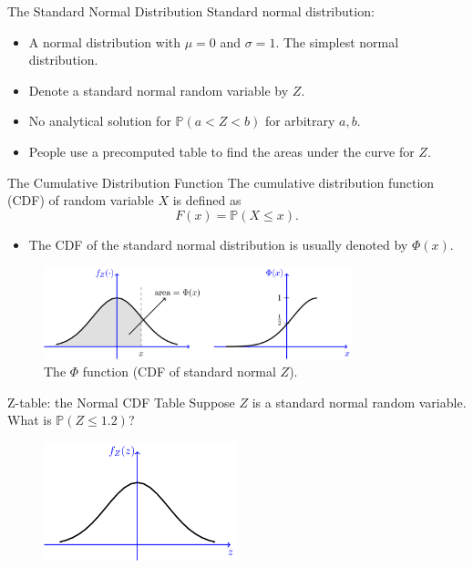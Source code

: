 \documentclass{beamer}
\newcommand{\pr}{\mathbb{P}}
\begin{document}
\begin{frame}{ The \alert{Standard} Normal Distribution}
Standard normal distribution:
\begin{itemize}
\item A normal distribution with $\mu=0$ and $\sigma=1$. The simplest normal distribution.
\item Denote a standard normal random variable by $Z$.
\item No analytical solution for $\pr(a<Z<b)$ for arbitrary $a,b$. 
\item People use a precomputed table to find the areas under the curve for $Z$.
\end{itemize}
\end{frame}

\begin{frame}{The Cumulative Distribution Function}
    The cumulative distribution function (CDF) of random variable $X$ is defined as
    $$ F(x) = \pr(X\leq x ).$$
    \begin{itemize}
    \item The CDF of the standard normal distribution is usually denoted by $\Phi(x)$.
    \end{itemize}
\begin{figure}
    \caption{The $\Phi$ function (CDF of standard normal $Z$).}
    \includegraphics[width=0.8\textwidth]{figures/phi.png}
\end{figure}
\end{frame}

\begin{frame}{Z-table: the Normal CDF Table}
    Suppose $Z$ is a standard normal random variable. What is $\pr (Z \leq 1.2)$?

\begin{figure}
    \includegraphics[width=0.5\textwidth]{figures/empty_pdf.png}
\end{figure}
\end{frame}
\end{document}
